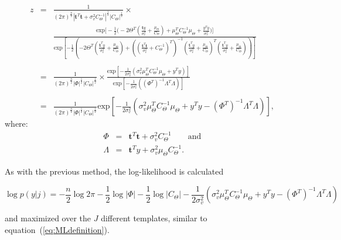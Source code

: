 {\setlength\arraycolsep{2pt}
\begin{eqnarray}\label{eq:z2}
z &=& \frac{1}{(2\pi)^{\frac{n}{2}} |\textbf{t}^T\textbf{t}+\sigma_v^2C_\Theta^{-1}|^{\frac{1}{2}} |C_\Theta|^{\frac{1}{2}}} \times {}\\\nonumber
& &\frac{\textrm{exp}\Bigg[-\frac{1}{2}\Bigg(- 2 \Theta^T\left(\frac{\textbf{t}y}{\sigma_v^2} + \frac{\mu_\Theta}{C_\Theta}\right) +  \mu_\Theta^TC_\Theta^{-1}\mu_\Theta + \frac{y^Ty}{\sigma_v^2}\Bigg)\Bigg]}{\textrm{exp}\left[-\frac{1}{2}\left(- 2\Theta^T\left(\frac{\textbf{t}^Ty}{\sigma_v^2} + \frac{\mu_\Theta}{C_\Theta}\right)  + \left(\left(\frac{\textbf{t}^T\textbf{t}}{\sigma_v^2} + C_\Theta^{-1}\right)^T\right)^{-1}\left(\frac{\textbf{t}^Ty}{\sigma_v^2} + \frac{\mu_\Theta}{C_\Theta}\right)^T\left(\frac{\textbf{t}^Ty}{\sigma_v^2} + \frac{\mu_\Theta}{C_\Theta}\right) \right)\right]}\\\nonumber{}\\\nonumber
&=& \frac{1}{(2\pi)^{\frac{n}{2}} |\Phi|^{\frac{1}{2}} |C_\Theta|^{\frac{1}{2}}}\times \frac{\textrm{exp}\left[-\frac{1}{2\sigma_v^2}\left(\sigma_v^2\mu_\Theta^TC_\Theta^{-1}\mu_\Theta + y^Ty\right)\right]}{\textrm{exp}\left[-\frac{1}{2\sigma_v^2}\left(\left(\Phi^T\right)^{-1}\Lambda^T\Lambda \right)\right]}\\\nonumber{}\\\nonumber
&=& \frac{1}{(2\pi)^{\frac{n}{2}} |\Phi|^{\frac{1}{2}}|C_\Theta|^{\frac{1}{2}}} \textrm{exp}\left[-\frac{1}{2\sigma_v^2}\left(\sigma_v^2\mu_\Theta^TC_\Theta^{-1}\mu_\Theta + y^Ty- \left(\Phi^T\right)^{-1}\Lambda^T\Lambda\right)\right],
\end{eqnarray}}
where:
\begin{eqnarray}
\label{eq:z3}
\Phi &=& \textbf{t}^T\textbf{t} + \sigma_v^2C_\Theta^{-1} \qquad \textrm{and}\\\nonumber
\Lambda &=& \textbf{t}^Ty + \sigma_v^2\mu_\Theta C_\Theta^{-1}.
\end{eqnarray}

As with the previous method, the log-likelihood is calculated

\begin{equation}\label{eq:loglikeli}
\log{p(y|j)} = - \frac{n}{2}\log{2 \pi}- \frac{1}{2}\log{|\Phi|} - \frac{1}{2}\log{|C_\Theta|} - \frac{1}{2\sigma^2_v}\left(\sigma_v^2\mu_\Theta^TC_\Theta^{-1}\mu_\Theta + y^Ty- \left(\Phi^T\right)^{-1}\Lambda^T\Lambda\right)
\end{equation}

and maximized over the $J$ different templates, similar to equation~(\ref{eq:MLdefinition}).

